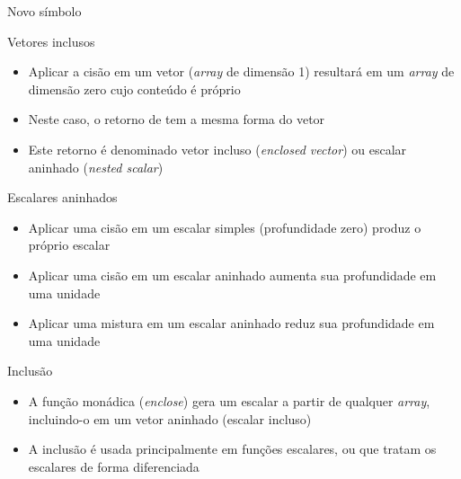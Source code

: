 \begin{frame}[fragile]{Novo símbolo}


\end{frame}

\begin{frame}[fragile]{Vetores inclusos}

    \begin{itemize}
        \item Aplicar a cisão em um vetor  (\textit{array} de dimensão 1) resultará em 
            um \textit{array} de dimensão zero cujo conteúdo é próprio 

        \item Neste caso, o retorno de  tem a mesma forma do vetor 

        \item Este retorno é denominado vetor incluso (\textit{enclosed vector}) ou escalar 
            aninhado (\textit{nested scalar})
    \end{itemize}

\end{frame}

\begin{frame}[fragile]{Escalares aninhados}

    \begin{itemize}
        \item Aplicar uma cisão em um escalar simples (profundidade zero) produz o próprio escalar

        \item Aplicar uma cisão em um escalar aninhado aumenta sua profundidade em uma unidade

        \item Aplicar uma mistura em um escalar aninhado reduz sua profundidade em uma unidade
    \end{itemize}

\end{frame}

\begin{frame}[fragile]{Inclusão}

    \begin{itemize}
        \item A função monádica  (\textit{enclose}) gera um escalar a partir de qualquer \textit{array}, incluindo-o em um vetor aninhado (escalar incluso)

        \item A inclusão é usada principalmente em funções escalares, ou que tratam os escalares de
            forma diferenciada
    \end{itemize}

\end{frame}


